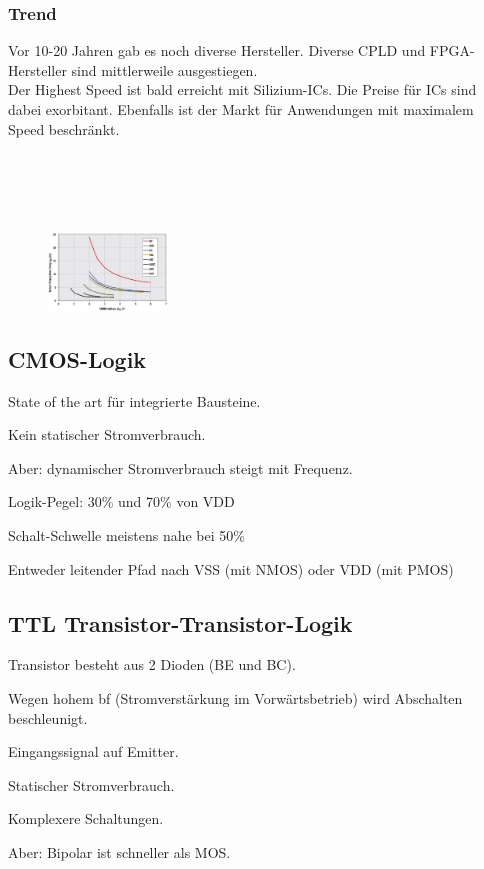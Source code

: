 \subsubsection{Trend}
Vor 10-20 Jahren gab es noch diverse Hersteller. Diverse CPLD und FPGA-Hersteller sind mittlerweile ausgestiegen. \\
Der Highest Speed ist bald erreicht mit Silizium-ICs. Die Preise für ICs sind dabei exorbitant. Ebenfalls ist der Markt für Anwendungen mit maximalem Speed beschränkt. \\
\ \\ \ \\ \ \\ \ \\

\begin{figure}
    \hspace{-60pt}
    \centering
    \includegraphics[width=0.28\textwidth]{images/cmos_logic}
\end{figure}
\subsection{CMOS-Logik}
\begin{compactitem}
    \item State of the art für integrierte Bausteine.
    \item Kein statischer Stromverbrauch.
    \item Aber: dynamischer Stromverbrauch steigt mit Frequenz.
    \item Logik-Pegel: 30\%  und 70\%  von VDD
    \item Schalt-Schwelle meistens nahe bei 50\%
    \item Entweder leitender Pfad nach VSS (mit NMOS) oder VDD (mit PMOS)
\end{compactitem}

\clearpage
\newpage

\subsection{TTL Transistor-Transistor-Logik}
\begin{compactitem}
    \item Transistor besteht aus 2 Dioden (BE und BC).
    \item Wegen hohem bf (Stromverstärkung im Vorwärtsbetrieb) wird Abschalten beschleunigt.
    \item Eingangssignal auf Emitter.
    \item Statischer Stromverbrauch.
    \item Komplexere Schaltungen.
    \item Aber: Bipolar ist schneller als MOS.
\end{compactitem}

